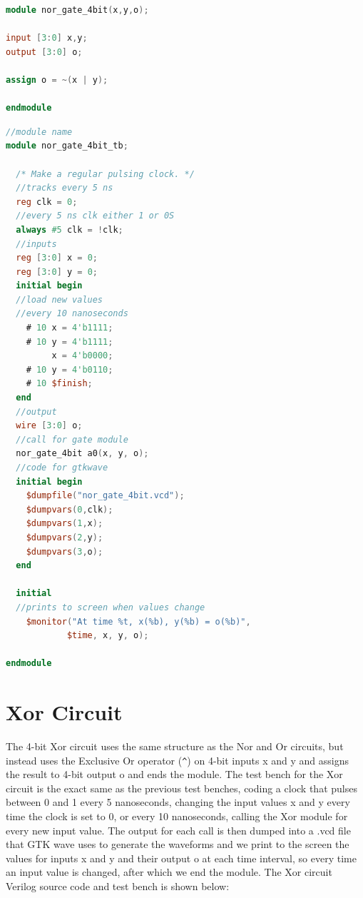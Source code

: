 \documentclass[runningheads, 12pt]{report}
\begin{document}
\begin{lstlisting}[language=Verilog, caption={Nor Circuit Verilog}]
module nor_gate_4bit(x,y,o);

input [3:0] x,y;
output [3:0] o;

assign o = ~(x | y);

endmodule
\end{lstlisting}

\begin{lstlisting}[language=Verilog, caption={Nor Circuit Test Bench}]
//module name
module nor_gate_4bit_tb;		

  /* Make a regular pulsing clock. */	
  //tracks every 5 ns
  reg clk = 0;
  //every 5 ns clk either 1 or 0S
  always #5 clk = !clk;	
  //inputs
  reg [3:0] x = 0;			
  reg [3:0] y = 0;
  initial begin	
  //load new values 
  //every 10 nanoseconds 
    # 10 x = 4'b1111;	
    # 10 y = 4'b1111;
    	 x = 4'b0000;
    # 10 y = 4'b0110;
    # 10 $finish;
  end
  //output
  wire [3:0] o;	
  //call for gate module
  nor_gate_4bit a0(x, y, o);		
  //code for gtkwave
  initial begin	
    $dumpfile("nor_gate_4bit.vcd");
    $dumpvars(0,clk);
    $dumpvars(1,x);
    $dumpvars(2,y);
    $dumpvars(3,o);
  end
  
  initial  
  //prints to screen when values change
    $monitor("At time %t, x(%b), y(%b) = o(%b)",  
    		$time, x, y, o);   
    									
endmodule 
\end{lstlisting}
	
	
	
	\section{Xor Circuit}
	
	The 4-bit Xor circuit uses the same structure as the Nor and Or circuits, but instead uses the Exclusive Or operator (\verb|^|) on 4-bit inputs x and y and assigns the result to 4-bit output o and ends the module. The test bench for the Xor circuit is the exact same as the previous test benches, coding a clock that pulses between 0 and 1 every 5 nanoseconds, changing the input values x and y every time the clock is set to 0, or every 10 nanoseconds, calling the Xor module for every new input value. The output for each call is then dumped into a .vcd file that GTK wave uses to generate the waveforms and we print to the screen the values for inputs x and y and their output o at each time interval, so every time an input value is changed, after which we end the module. The Xor circuit Verilog source code and test bench is shown below:
	
\end{document}
